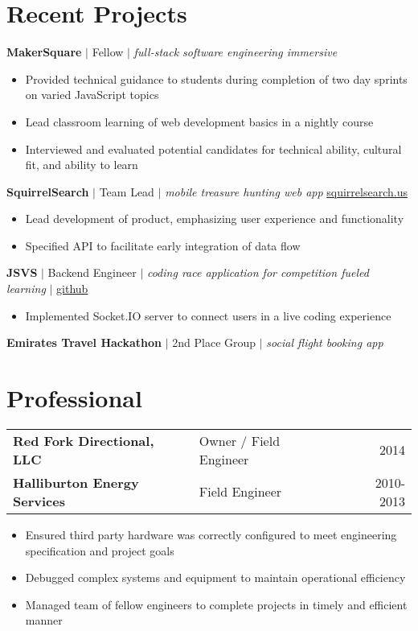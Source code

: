\documentclass[11pt]{article}
\newenvironment{myitemize}
{ \vspace{-0.5em}
  \begin{itemize}
    \setlength{\itemsep}{-5pt}
    \setlength{\parskip}{0pt}
    \setlength{\parsep}{0pt}
}
{ \end{itemize}
  \vspace{-0.5em}
}
\newcommand*\majitem{
  \vspace{-0.25em}
  \item[$\circ$]
  \vspace{-0.25em}
}
\begin{document}
\section*{Recent Projects}
\noindent
\textbf{MakerSquare} $\vert$ Fellow $\vert$ \emph{full-stack software engineering immersive} \\
\begin{myitemize}
  \majitem Provided technical guidance to students during completion of two day sprints on varied JavaScript topics \\
  \majitem Lead classroom learning of web development basics in a nightly course \\
  \majitem Interviewed and evaluated potential candidates for technical ability, cultural fit, and ability to learn \\
\end{myitemize}
\noindent
\textbf{SquirrelSearch} $\vert$ Team Lead $\vert$ \emph{mobile treasure hunting web app} \href{http://squirrelsearch.us}{\color{blue}squirrelsearch.us} \\
\begin{myitemize}
  \majitem Lead development of product, emphasizing user experience and functionality \\
  \majitem Specified API to facilitate early integration of data flow \\
\end{myitemize}
\noindent
\textbf{JSVS} $\vert$ Backend Engineer $\vert$ \emph{coding race application for competition fueled learning} $\vert$ \href{https://github.com/TheFourLoops/JSVS}{\color{blue}github} \\
\begin{myitemize}
  \majitem Implemented Socket.IO server to connect users in a live coding experience \\
\end{myitemize}

\noindent
\textbf{Emirates Travel Hackathon} $\vert$ 2nd Place Group $\vert$ \emph{social flight booking app}
\section*{Professional}
\noindent
\begin{tabularx}{\textwidth}{l l X r}
\textbf{Red Fork Directional, LLC} & Owner / Field Engineer & & 2014 \\
\textbf{Halliburton Energy Services} & Field Engineer & & 2010-2013 \\
\end{tabularx}
\begin{myitemize}
  \majitem Ensured third party hardware was correctly configured to meet engineering specification and project goals\\
  \majitem Debugged complex systems and equipment to maintain operational efficiency \\
  \majitem Managed team of fellow engineers to complete projects in timely and efficient manner \\
\end{myitemize}
\end{document}

